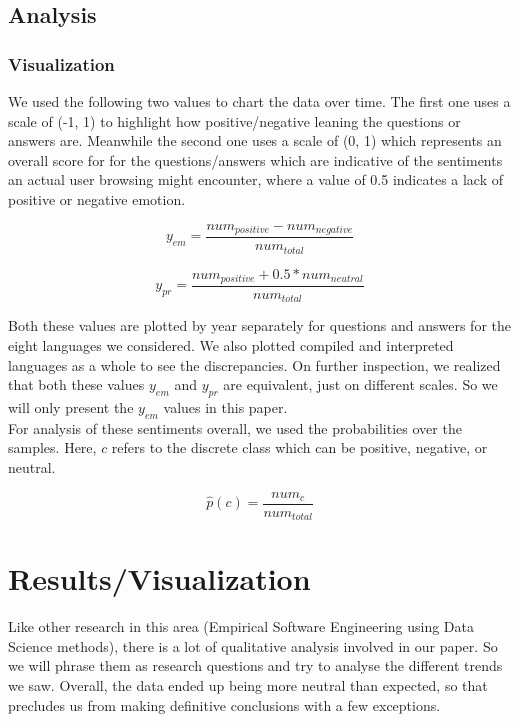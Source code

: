 \documentclass[conference]{IEEEtran}
\begin{document}
\subsection{Analysis}
\subsubsection{Visualization}
We used the following two values to chart the data over time. The first one uses a scale of (-1, 1) to highlight how positive/negative leaning the questions or answers are. Meanwhile the second one uses a scale of (0, 1) which represents an overall score for for the questions/answers which are indicative of the sentiments an actual user browsing might encounter, where a value of 0.5 indicates a lack of positive or negative emotion.

\begin{equation}
    y_{em} = \frac{num_{positive} - num_{negative}}{num_{total}}
\end{equation}

\begin{equation}
    y_{pr} = \frac{num_{positive} + 0.5*num_{neutral}}{num_{total}}
\end{equation}

Both these values are plotted by year separately for questions and answers for the eight languages we considered. We also plotted compiled and interpreted languages as a whole to see the discrepancies. On further inspection, we realized that both these values $y_{em}$ and $y_{pr}$ are equivalent, just on different scales. So we will only present the $y_{em}$ values in this paper. \\

For analysis of these sentiments overall, we used the probabilities over the samples. Here, $c$ refers to the discrete class which can be positive, negative, or neutral.

\begin{equation}
    \hat{p}(c) = \frac{num_c}{num_{total}}
\end{equation}

\vspace{6pt}
\section{Results/Visualization}
Like other research in this area (Empirical Software Engineering using Data Science methods), there is a lot of qualitative analysis involved in our paper. So we will phrase them as research questions and try to analyse the different trends we saw. Overall, the data ended up being more neutral than expected, so that precludes us from making definitive conclusions with a few exceptions. \\
\end{document}
